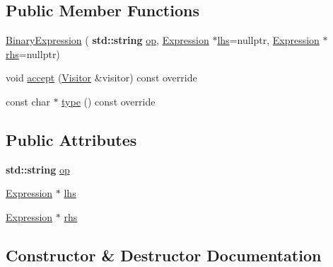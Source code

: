 \subsection*{Public Member Functions}
\begin{DoxyCompactItemize}
\item 
\hyperlink{struct_binary_expression_a6fb4760b068f658a3b65271ab5f46b73}{Binary\+Expression} (\textbf{ std\+::string} \hyperlink{struct_binary_expression_a4c33b66e2ffc0a5ede2cdd190bf4bd75}{op}, \hyperlink{struct_expression}{Expression} $\ast$\hyperlink{struct_binary_expression_ae689284a646929c99e634e75f50cb32c}{lhs}=nullptr, \hyperlink{struct_expression}{Expression} $\ast$\hyperlink{struct_binary_expression_ad569ae3b07f428257b0e7a96746ceb32}{rhs}=nullptr)
\item 
void \hyperlink{struct_binary_expression_af8318bd8b21b4bbca064e8a6086a10a0}{accept} (\hyperlink{struct_visitor}{Visitor} \&visitor) const override
\item 
const char $\ast$ \hyperlink{struct_binary_expression_a9ab583e823bac39ed8fd8eb34747ac9f}{type} () const override
\end{DoxyCompactItemize}
\subsection*{Public Attributes}
\begin{DoxyCompactItemize}
\item 
\textbf{ std\+::string} \hyperlink{struct_binary_expression_a4c33b66e2ffc0a5ede2cdd190bf4bd75}{op}
\item 
\hyperlink{struct_expression}{Expression} $\ast$ \hyperlink{struct_binary_expression_ae689284a646929c99e634e75f50cb32c}{lhs}
\item 
\hyperlink{struct_expression}{Expression} $\ast$ \hyperlink{struct_binary_expression_ad569ae3b07f428257b0e7a96746ceb32}{rhs}
\end{DoxyCompactItemize}


\subsection{Constructor \& Destructor Documentation}
\mbox{\label{struct_binary_expression_a6fb4760b068f658a3b65271ab5f46b73}} 
